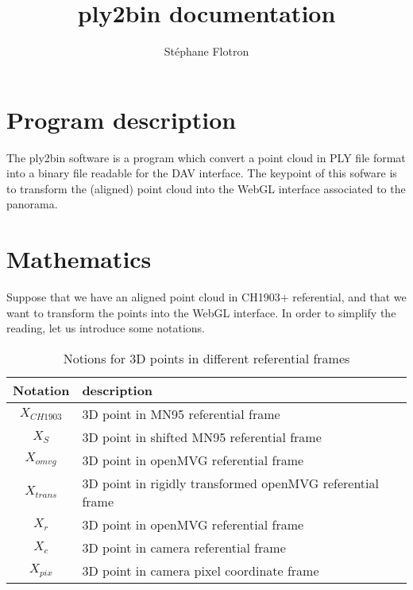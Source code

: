 \documentclass[a4paper, 11pt]{article}
\author{ St\'ephane Flotron }
\title{\textbf{ply2bin documentation}}
\begin{document}
   \maketitle
   
   \section*{Program description}
   
   The ply2bin software is a program which convert a point cloud in PLY file format into 
   a binary file readable for the DAV interface. 
   The keypoint of this sofware is to transform the (aligned) point cloud into the WebGL
   interface associated to the panorama.
   
   \section*{Mathematics}
   
   Suppose that we have an aligned point cloud in CH1903+ referential, and that we want to transform the points into
   the WebGL interface. In order to simplify the reading, let us introduce some notations. 
   
   \begin{table}[H]
      \begin{center}
        \begin{tabular}{|c|l|}
                \hline 
                    Notation & description \\
                \hline
                    $X_{CH1903}$ & 3D point in MN95 referential frame \\
                    $X_S$       & 3D point in shifted MN95 referential frame \\
                    $X_{omvg}$   & 3D point in openMVG referential frame \\
                    $X_{trans}$ & 3D point in rigidly transformed openMVG referential frame \\
                    $X_r$       & 3D point in openMVG referential frame \\
                    $X_c$       & 3D point in camera referential frame \\
                    $X_{pix}$   & 3D point in camera pixel coordinate frame \\
                \hline
        \end{tabular}
      \end{center}
      \label{3D point notation}
      \caption{Notions for 3D points in different referential frames}
   \end{table}
   
\end{document}
